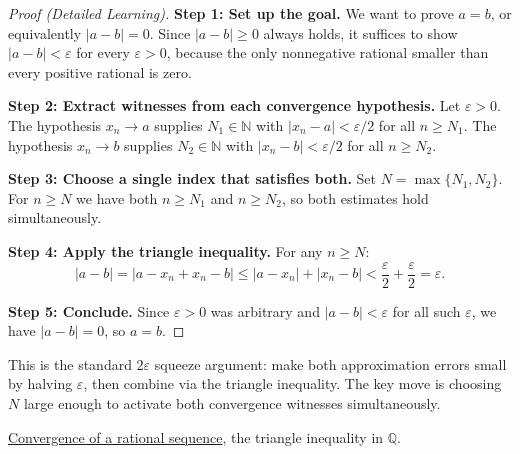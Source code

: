 \begin{proof}[Proof (Detailed Learning)]
\textbf{Step 1: Set up the goal.}
We want to prove $a = b$, or equivalently $|a - b| = 0$.
Since $|a - b| \geq 0$ always holds, it suffices to show $|a - b| < \varepsilon$
for every $\varepsilon > 0$, because the only nonnegative rational smaller
than every positive rational is zero.

\textbf{Step 2: Extract witnesses from each convergence hypothesis.}
Let $\varepsilon > 0$.  The hypothesis $x_n \to a$ supplies $N_1 \in \mathbb{N}$
with $|x_n - a| < \varepsilon/2$ for all $n \geq N_1$.
The hypothesis $x_n \to b$ supplies $N_2 \in \mathbb{N}$
with $|x_n - b| < \varepsilon/2$ for all $n \geq N_2$.

\textbf{Step 3: Choose a single index that satisfies both.}
Set $N = \max\{N_1, N_2\}$.  For $n \geq N$ we have both $n \geq N_1$
and $n \geq N_2$, so both estimates hold simultaneously.

\textbf{Step 4: Apply the triangle inequality.}
For any $n \geq N$:
\[
|a - b|
= |a - x_n + x_n - b|
\leq |a - x_n| + |x_n - b|
< \frac{\varepsilon}{2} + \frac{\varepsilon}{2}
= \varepsilon.
\]

\textbf{Step 5: Conclude.}
Since $\varepsilon > 0$ was arbitrary and $|a - b| < \varepsilon$ for
all such $\varepsilon$, we have $|a - b| = 0$, so $a = b$.
\end{proof}

\begin{remark*}
This is the standard $2\varepsilon$ squeeze argument: make both approximation
errors small by halving $\varepsilon$, then combine via the triangle inequality.
The key move is choosing $N$ large enough to activate both convergence witnesses
simultaneously.
\end{remark*}

\begin{dependencies}
\hyperref[def:convergent-rational-sequence]{Convergence of a rational sequence},
the triangle inequality in $\mathbb{Q}$.
\end{dependencies}
